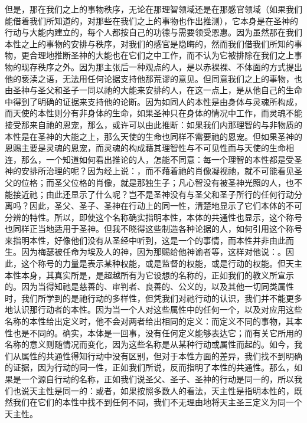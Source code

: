 但是，那在我们之上的事物秩序，无论在那理智领域还是在那感官领域（如果我们能借着我们所知道的，对那些在我们之上的事物也作出推测），它本身是在圣神的行动与大能内建立的，每个人都按自己的功德与需要领受恩惠。因为虽然那在我们本性之上的事物的安排与秩序，对我们的感官是隐晦的，然而我们借我们所知的事物，更合理地推断圣神的大能也在它们之中工作，而不认为它被排除在我们之上事物的现存秩序之外。因为那主张后一种观点的人，是以赤裸裸、不体面的方式提出他的亵渎之语，无法用任何论据支持他那荒谬的意见。但同意我们之上的事物，也由圣神与圣父和圣子一同以祂的大能来安排的人，在这一点上，是从他自己的生命中得到了明确的证据来支持他的论断。因为如同人的本性是由身体与灵魂所构成，而天使的本性则分有非身体的生命，如果圣神只在身体的情况中工作，而灵魂不能接受那来自祂的恩宠，那么，或许可以由此推断：如果我们内那理智的与非物质的本性是在圣神的大能之上，那么天使的生命也同样不需要祂的恩宠。但如果圣神的恩赐主要是灵魂的恩宠，而灵魂的构成藉其理智性与不可见性而与天使的生命相连，那么，一个知道如何看出推论的人，怎能不同意：每一个理智的本性都是受圣神的安排所治理的呢？因为经上说：，而不藉着祂的肖像凝视祂，就不可能看见圣父的位格；而圣父位格的肖像，就是那独生子；凡心智没有被圣神光照的人，也不能接近祂；由此还显示了什么呢？岂不是圣神没有与圣父和圣子所行的任何行动分离吗？因此，圣父、圣子、圣神在行动上的同一性，清楚地显示了它们本体的不可分辨的特性。所以，即使这个名称确实指明本性，本体的共通性也显示，这个称号也同样正当地适用于圣神。但我不晓得这些制造各种论据的人，如何引用这个称号来指明本性，好像他们没有从圣经中听到，这是一个的事情，而本性并非由此而生。因为梅瑟被任命为埃及人的神，因为那赐给他神谕者等，这样对他说：。因此，这个称号的力量是表示某种权能，或是监督的权能，或是行动的权能。但天主本性本身，其真实所是，是超越所有为它设想的名称的，正如我们的教义所宣示的。因为当得知祂是慈善的、审判者、良善的、公义的，以及其他一切同类属性时，我们所学到的是祂行动的多样性，但凭我们对祂行动的认识，我们并不能更多地认识那行动者的本性。因为当一个人对这些属性中的任何一个，以及对应用这些名称的本性给出定义时，他不会对两者给出相同的定义：而定义不同的事物，其本性也是不同的。确实，本体是一回事，没有任何定义能够表达它；而有关它所用的名称的意义则随情况而变化，因为这些名称是从某种行动或属性而起的。如今，我们从属性的共通性得知行动中没有区别，但对于本性方面的差异，我们找不到明确的证据，因为行动的同一性，正如我们所说，反而指明了本性的共通性。那么，如果是一个源自行动的名称，正如我们说圣父、圣子、圣神的行动是同一的，所以我们也说天主性是同一的：或者，如果按照多数人的看法，天主性是指明本性的，既然我们在它们的本性中找不到任何不同，我们不无理由地将天主圣三定义为同一个天主性。\par

